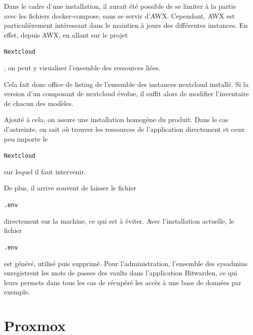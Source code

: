 \documentclass[12pt, a4paper, twoside]{article}
\begin{document}
Dans le cadre d'une installation, il aurait été possible de se limiter à la partie avec les fichiers docker-compose, sans se servir d'AWX. 
Cependant, AWX est particulièrement intéressant dans le maintien à jours des différentes instances. 
En effet, depuis AWX, en allant sur le projet \begin{code}\texttt{\gls{Nextcloud}}\end{code}, on peut y visualiser l'ensemble des ressources liées.

Cela fait donc office de listing de l'ensemble des instances nextcloud installé. 
Si la version d'un composant de nextcloud évolue, il suffit alors de modifier l'inventaire de chacun des modèles.

Ajouté à cela, on assure une installation homogène du produit. 
Dans le cas d'astreinte, on sait où trouver les ressources de l'application directement et ceux peu importe le \begin{code}\texttt{\gls{Nextcloud}}\end{code} sur lequel il faut intervenir.

De plus, il arrive souvent de laisser le fichier \begin{code}\texttt{.env}\end{code} directement sur la machine, ce qui est à éviter. 
Avec l'installation actuelle, le fichier \begin{code}\texttt{.env}\end{code} est généré, utilisé puis supprimé. 
Pour l'administration, l'ensemble des sysadmins enregistrent les mots de passes des vaults dans l'application Bitwarden, ce qui leurs permets dans tous les cas de récupéré les accès à une base de données par exemple.

\newpage
\section{Proxmox}
\end{document}
